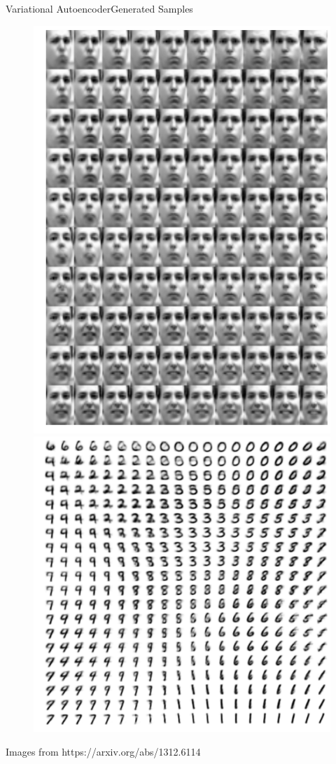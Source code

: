 \documentclass{beamer}
\begin{document}
\begin{frame}{Variational Autoencoder}{Generated Samples}
    \begin{figure}
        \centering
        \includegraphics[height=0.6\textheight]{freyface_10x10}
        \includegraphics[height=0.6\textheight]{mnist_20x20}
    \end{figure}
    {\small Images from https://arxiv.org/abs/1312.6114}
\end{frame}
\end{document}
